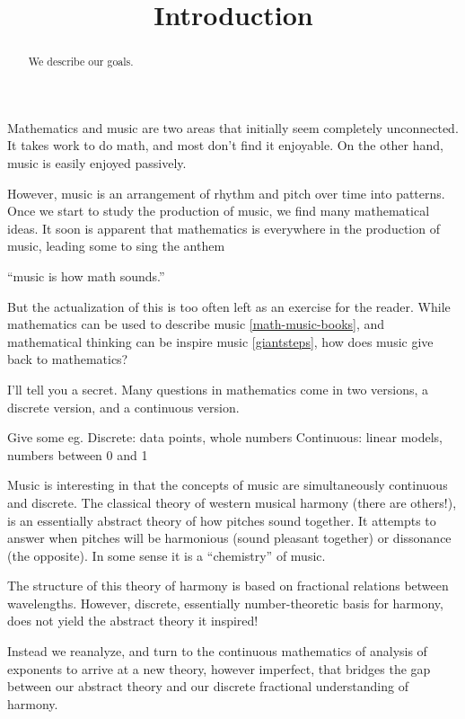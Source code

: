 \documentclass[12pt]{ximera}
\title{Introduction}
\begin{document}
\begin{abstract}
    We describe our goals.
\end{abstract}
\maketitle



Mathematics and music are two areas that initially seem completely unconnected. It takes work to do math, and most don't find it enjoyable. On the other hand, music is easily enjoyed passively.


However, music is an arrangement of rhythm and pitch over time into patterns. Once we start to study the production of music, we find many mathematical ideas. It soon is apparent that mathematics is everywhere in the production of music, leading some to sing the anthem
\begin{center}
    ``music is how math sounds.''
\end{center}
But the actualization of this is too often left as an exercise for the reader. While mathematics can be used to describe music \ref{math-music-books}, and mathematical thinking can be inspire music \ref{giantsteps}, how does music give back to mathematics?

I'll tell you a secret. Many questions in mathematics come in two versions, a discrete version, and a continuous version. 

Give some eg.
Discrete: data points, whole numbers
Continuous: linear models, numbers between 0 and 1

Music is interesting in that the concepts of music are simultaneously continuous and discrete. The classical theory of western musical harmony (there are others!), is an essentially abstract theory of how pitches sound together. It attempts to answer when pitches will be harmonious (sound pleasant together) or 
dissonance (the opposite). In some sense it is a ``chemistry'' of music. 


The structure of this theory of harmony is based on fractional relations between wavelengths. However, discrete, essentially number-theoretic basis for harmony, does not yield the abstract theory it inspired!


Instead we reanalyze, and turn to the continuous mathematics of analysis of exponents to arrive at a new theory, however imperfect, that bridges the gap between our abstract theory and our discrete fractional understanding of harmony. 
\end{document}
